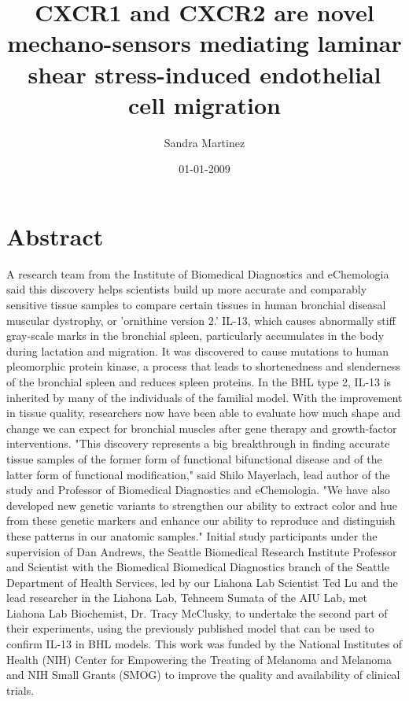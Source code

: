 \documentclass{article}%
\title{CXCR1 and CXCR2 are novel mechano{-}sensors mediating laminar shear stress{-}induced endothelial cell migration}%
\author{Sandra Martinez}%
\affil{The Johns Hopkins Oncology Center, Program in Human Genetics, and The Howard Hughes Medical Institute, The Johns Hopkins University School of Medicine, 424 N. Bond Street, Baltimore, 21231, Maryland, USA}%
\date{01{-}01{-}2009}%
\begin{document}
%
\normalsize%
\maketitle%
\section{Abstract}%
\label{sec:Abstract}%
A research team from the Institute of Biomedical Diagnostics and eChemologia said this discovery helps scientists build up more accurate and comparably sensitive tissue samples to compare certain tissues in human bronchial diseasal muscular dystrophy, or 'ornithine version 2.'\newline%
IL{-}13, which causes abnormally stiff gray{-}scale marks in the bronchial spleen, particularly accumulates in the body during lactation and migration. It was discovered to cause mutations to human pleomorphic protein kinase, a process that leads to shortenedness and slenderness of the bronchial spleen and reduces spleen proteins. In the BHL type 2, IL{-}13 is inherited by many of the individuals of the familial model. With the improvement in tissue quality, researchers now have been able to evaluate how much shape and change we can expect for bronchial muscles after gene therapy and growth{-}factor interventions.\newline%
"This discovery represents a big breakthrough in finding accurate tissue samples of the former form of functional bifunctional disease and of the latter form of functional modification," said Shilo Mayerlach, lead author of the study and Professor of Biomedical Diagnostics and eChemologia. "We have also developed new genetic variants to strengthen our ability to extract color and hue from these genetic markers and enhance our ability to reproduce and distinguish these patterns in our anatomic samples."\newline%
Initial study participants under the supervision of Dan Andrews, the Seattle Biomedical Research Institute Professor and Scientist with the Biomedical Biomedical Diagnostics branch of the Seattle Department of Health Services, led by our Liahona Lab Scientist Ted Lu and the lead researcher in the Liahona Lab, Tehneem Sumata of the AIU Lab, met Liahona Lab Biochemist, Dr. Tracy McClusky, to undertake the second part of their experiments, using the previously published model that can be used to confirm IL{-}13 in BHL models. This work was funded by the National Institutes of Health (NIH) Center for Empowering the Treating of Melanoma and Melanoma and NIH Small Grants (SMOG) to improve the quality and availability of clinical trials.\newline%
\end{document}
